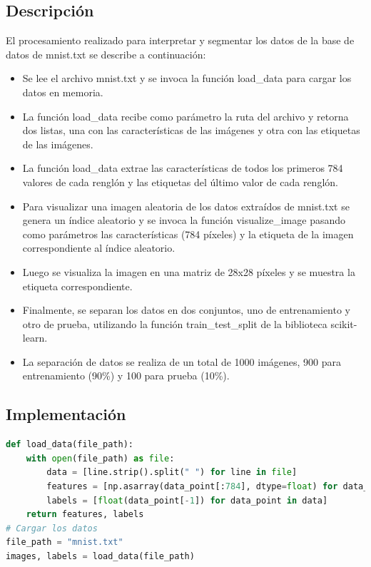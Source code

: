 \documentclass{article}
\begin{document}
    \subsection{Descripción}\label{subsec:descripcion}
    El procesamiento realizado para interpretar y segmentar los datos de la base de datos de mnist.txt se describe a continuación:
    \begin{itemize}
        \item Se lee el archivo mnist.txt y se invoca la función load\_data para cargar los datos en memoria.
        \item La función load\_data recibe como parámetro la ruta del archivo y retorna dos listas, una con las características de las imágenes y otra con las etiquetas de las imágenes.
        \item La función load\_data extrae las características de todos los primeros 784 valores de cada renglón y las etiquetas del último valor de cada renglón.
        \item Para visualizar una imagen aleatoria de los datos extraídos de mnist.txt se genera un índice aleatorio
        y se invoca la función visualize\_image pasando como parámetros las características (784 píxeles) y la etiqueta de la imagen correspondiente al índice aleatorio.
        \item Luego se visualiza la imagen en una matriz de 28x28 píxeles y se muestra la etiqueta correspondiente.
        \item Finalmente, se separan los datos en dos conjuntos, uno de entrenamiento y otro de prueba, utilizando la función train\_test\_split de la biblioteca scikit-learn.
        \item La separación de datos se realiza de un total de 1000 imágenes, 900 para entrenamiento (90\%) y 100 para prueba (10\%).
    \end{itemize}

    \subsection{Implementación}\label{subsec:implementacion}

    \begin{lstlisting}[language=Python, caption={carga de datos}, label={lst:load_data}]
def load_data(file_path):
    with open(file_path) as file:
        data = [line.strip().split(" ") for line in file]
        features = [np.asarray(data_point[:784], dtype=float) for data_point in data] # pixeles de la imágen
        labels = [float(data_point[-1]) for data_point in data]                       # clase a la que pertenece
    return features, labels
# Cargar los datos
file_path = "mnist.txt"
images, labels = load_data(file_path)
    \end{lstlisting}
\end{document}
